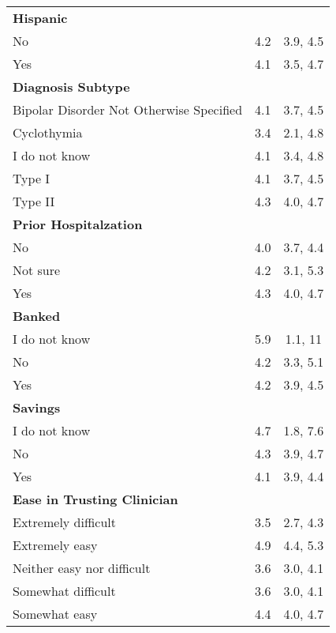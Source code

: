 \begin{longtable}{lcc}
\textbf{Hispanic} &  & \\
\hspace{1em}No & 4.2 & 3.9, 4.5\\
\hspace{1em}Yes & 4.1 & 3.5, 4.7\\

\textbf{Diagnosis Subtype} &  & \\
\hspace{1em}Bipolar Disorder Not Otherwise Specified & 4.1 & 3.7, 4.5\\
\hspace{1em}Cyclothymia & 3.4 & 2.1, 4.8\\
\hspace{1em}I do not know & 4.1 & 3.4, 4.8\\
\hspace{1em}Type I & 4.1 & 3.7, 4.5\\
\hspace{1em}Type II & 4.3 & 4.0, 4.7\\

\textbf{Prior Hospitalzation} &  & \\
\hspace{1em}No & 4.0 & 3.7, 4.4\\
\hspace{1em}Not sure & 4.2 & 3.1, 5.3\\
\hspace{1em}Yes & 4.3 & 4.0, 4.7\\

\textbf{Banked} &  & \\
\hspace{1em}I do not know & 5.9 & 1.1, 11\\
\hspace{1em}No & 4.2 & 3.3, 5.1\\
\hspace{1em}Yes & 4.2 & 3.9, 4.5\\

\textbf{Savings} &  & \\
\hspace{1em}I do not know & 4.7 & 1.8, 7.6\\
\hspace{1em}No & 4.3 & 3.9, 4.7\\
\hspace{1em}Yes & 4.1 & 3.9, 4.4\\

\textbf{Ease in Trusting Clinician} &  & \\
\hspace{1em}Extremely difficult & 3.5 & 2.7, 4.3\\
\hspace{1em}Extremely easy & 4.9 & 4.4, 5.3\\
\hspace{1em}Neither easy nor difficult & 3.6 & 3.0, 4.1\\
\hspace{1em}Somewhat difficult & 3.6 & 3.0, 4.1\\
\hspace{1em}Somewhat easy & 4.4 & 4.0, 4.7\\


\end{longtable}

